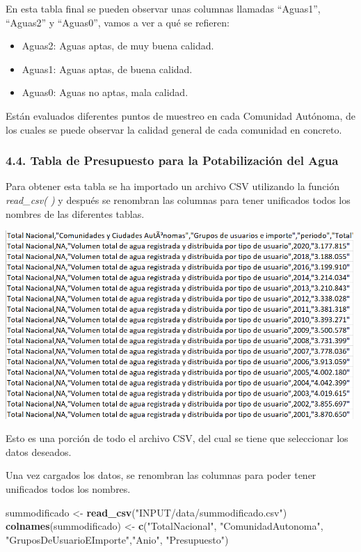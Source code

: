 \documentclass[
]{article}
\newenvironment{Shaded}{\begin{snugshade}}{\end{snugshade}}
\newcommand{\FunctionTok}[1]{\textcolor[rgb]{0.13,0.29,0.53}{\textbf{#1}}}
\newcommand{\NormalTok}[1]{#1}
\newcommand{\OtherTok}[1]{\textcolor[rgb]{0.56,0.35,0.01}{#1}}
\newcommand{\StringTok}[1]{\textcolor[rgb]{0.31,0.60,0.02}{#1}}
\begin{document}
En esta tabla final se pueden observar unas columnas llamadas
``Aguas1'', ``Aguas2'' y ``Aguas0'', vamos a ver a qué se refieren:

\begin{itemize}
\item
  Aguas2: Aguas aptas, de muy buena calidad.
\item
  Aguas1: Aguas aptas, de buena calidad.
\item
  Aguas0: Aguas no aptas, mala calidad.
\end{itemize}

Están evaluados diferentes puntos de muestreo en cada Comunidad
Autónoma, de los cuales se puede observar la calidad general de cada
comunidad en concreto.

\hypertarget{tabla-de-presupuesto-para-la-potabilizaciuxf3n-del-agua}{%
\subsubsection{4.4. Tabla de Presupuesto para la Potabilización del
Agua}\label{tabla-de-presupuesto-para-la-potabilizaciuxf3n-del-agua}}

Para obtener esta tabla se ha importado un archivo CSV utilizando la
función \emph{read\_csv( )} y después se renombran las columnas para
tener unificados todos los nombres de las diferentes tablas.

\includegraphics[width=5.20833in,height=\textheight]{INPUT/images/PresupuestoCSV.png}

Esto es una porción de todo el archivo CSV, del cual se tiene que
seleccionar los datos deseados.

Una vez cargados los datos, se renombran las columnas para poder tener
unificados todos los nombres.

\begin{Shaded}
\begin{Highlighting}[]
\NormalTok{summodificado }\OtherTok{\textless{}{-}} \FunctionTok{read\_csv}\NormalTok{(}\StringTok{"INPUT/data/summodificado.csv"}\NormalTok{)}
\FunctionTok{colnames}\NormalTok{(summodificado) }\OtherTok{\textless{}{-}} \FunctionTok{c}\NormalTok{(}\StringTok{"TotalNacional"}\NormalTok{, }\StringTok{"ComunidadAutonoma"}\NormalTok{, }\StringTok{"GruposDeUsuarioEImporte"}\NormalTok{,}\StringTok{"Anio"}\NormalTok{, }\StringTok{"Presupuesto"}\NormalTok{)}
\end{Highlighting}
\end{Shaded}
\end{document}
